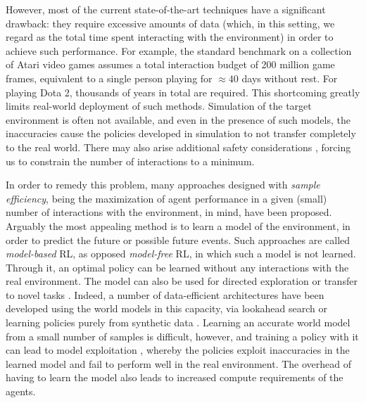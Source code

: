 \documentclass[en]{pracamgr}
\begin{document}
However, most of the current state-of-the-art techniques have a significant drawback: they require excessive amounts of data (which, in this setting, we regard as the total time spent interacting with the environment) in order to achieve such performance. For example, the standard benchmark on a collection of Atari video games \autocite{bellemareArcadeLearningEnvironment2013} assumes a total interaction budget of 200 million game frames, equivalent to a single person playing for $\approx 40$ days without rest. For playing Dota 2, thousands of years in total are required. This shortcoming greatly limits real-world deployment of such methods. Simulation of the target environment is often not available, and even in the presence of such models, the inaccuracies cause the policies developed in simulation to not transfer completely to the real world. There may also arise additional safety considerations \autocite{yampolskiy2018artificial}, forcing us to constrain the number of interactions to a minimum.

In order to remedy this problem, many approaches designed with \emph{sample efficiency}, being the maximization of agent performance in a given (small) number of interactions with the environment, in mind, have been proposed. Arguably the most appealing method is to learn a model of the environment, in order to predict the future or possible future events. Such approaches are called \emph{model-based} RL, as opposed \emph{model-free} RL, in which such a model is not learned. Through it, an optimal policy can be learned without any interactions with the real environment. The model can also be used for directed exploration \autocite{sekarPlanningExploreSelfSupervised2020} or transfer to novel tasks \autocite{byravanImaginedValueGradients2019}. Indeed, a number of data-efficient architectures have been developed using the world models in this capacity, via lookahead search \autocite{schrittwieserMasteringAtariGo2020,yeMasteringAtariGames2021} or learning policies purely from synthetic data \autocite{haRecurrentWorldModels2018,hafnerDreamControlLearning2020,kaiserModelBasedReinforcementLearning2024,hafnerMasteringDiverseDomains2024}. Learning an accurate world model from a small number of samples is difficult, however, and training a policy with it can lead to model exploitation \autocite{kurutachModelEnsembleTrustRegionPolicy2018}, whereby the policies exploit inaccuracies in the learned model and fail to perform well in the real environment. The overhead of having to learn the model also leads to increased compute requirements of the agents.
\end{document}
